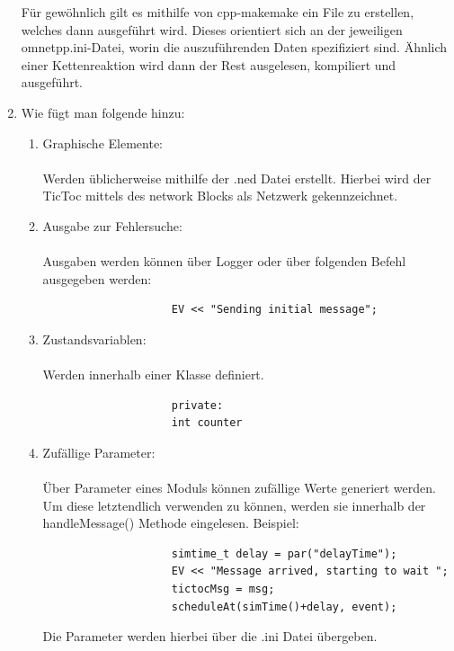 \documentclass[11pt]{article}
\begin{document}
\begin{enumerate}[\thesubsection .1]
        Für gewöhnlich gilt es mithilfe von cpp-makemake ein File zu erstellen, welches dann ausgeführt wird.
        Dieses orientiert sich an der jeweiligen omnetpp.ini-Datei, worin die auszuführenden Daten spezifiziert sind.
        Ähnlich einer Kettenreaktion wird dann der Rest ausgelesen, kompiliert und ausgeführt.\\

        \item Wie fügt man folgende hinzu:
        \begin{addmargin}[1em]{1em}
            \begin{enumerate}
                \item{Graphische Elemente:\\\\}
                Werden üblicherweise mithilfe der .ned Datei erstellt.
                Hierbei wird der TicToc mittels des network Blocks als Netzwerk
                gekennzeichnet.\\

                \item{Ausgabe zur Fehlersuche:\\\\}
                Ausgaben werden können über Logger oder über folgenden Befehl ausgegeben werden:
                \begin{lstlisting}
                    EV << "Sending initial message";
                \end{lstlisting}
                \item{Zustandsvariablen:\\\\}
                Werden innerhalb einer Klasse definiert.

                \begin{lstlisting}
                    private:
                    int counter
                \end{lstlisting}

                \item{Zufällige Parameter:\\\\}
                Über Parameter eines Moduls können zufällige Werte generiert werden.
                Um diese letztendlich verwenden zu können, werden sie innerhalb der
                handleMessage() Methode eingelesen.
                Beispiel:\\
                \begin{lstlisting}
                    simtime_t delay = par("delayTime");
                    EV << "Message arrived, starting to wait ";
                    tictocMsg = msg;
                    scheduleAt(simTime()+delay, event);
                \end{lstlisting}
                Die Parameter werden hierbei über die .ini Datei übergeben.


\end{enumerate}
\end{addmargin}
\end{enumerate}
\end{document}

